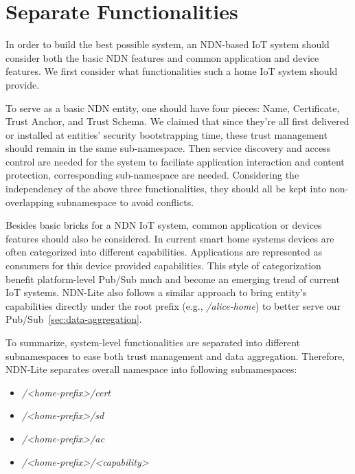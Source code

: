 \section{Separate Functionalities}
\label{sec:separation}

In order to build the best possible system, an NDN-based IoT system should consider both the basic NDN features and common application and device features.
We first consider what functionalities such a home IoT system should provide. 

To serve as a basic NDN entity, one should have four pieces: Name, Certificate, Trust Anchor, and Trust Schema.
We claimed that since they're all first delivered or installed at entities' security bootstrapping time, these trust management should remain in the same sub-namespace.
Then service discovery and access control are needed for the system to faciliate application interaction and content protection, corresponding sub-namespace are needed. 
Considering the independency of the above three functionalities, they should all be kept into non-overlapping subnamespace to avoid conflicts.

Besides basic bricks for a NDN IoT system, common application or devices features should also be considered.
In current smart home systems devices are often categorized into different capabilities. Applications are represented as consumers for this device provided capabilities.
This style of categorization benefit platform-level Pub/Sub much and become an emerging trend of current IoT systems.
NDN-Lite also follows a similar approach to bring entity's capabilities directly under the root prefix (e.g., \textsl{/alice-home}) to better serve our Pub/Sub~\ref{sec:data-aggregation}.

To summarize, system-level functionalities are separated into different subnamespaces to ease both trust management and data aggregation.
Therefore, NDN-Lite separates overall namespace into following subnamespaces:

\begin{itemize}
\setlength{\itemsep}{0pt}
    \item \textsl{/<home-prefix>/cert}
    \item \textsl{/<home-prefix>/sd}
    \item \textsl{/<home-prefix>/ac}
    \item \textsl{/<home-prefix>/<capability>}
\end{itemize}